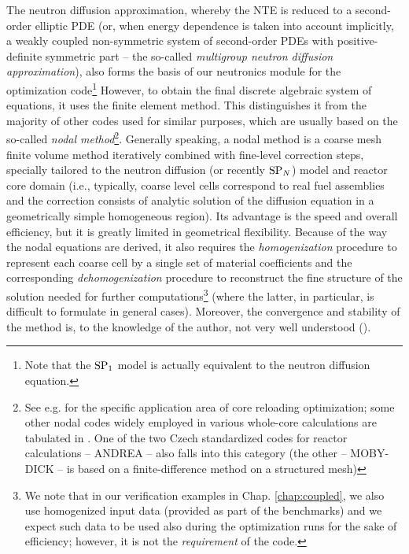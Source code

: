 The neutron diffusion approximation, whereby the NTE is reduced to a second-order elliptic PDE (or, when energy
dependence is taken into account implicitly, a weakly coupled non-symmetric system of second-order PDEs with
positive-definite symmetric part -- the so-called \textit{multigroup neutron diffusion approximation}), also forms the
basis of our neutronics module for the optimization code\footnote{Note that the $\SPN[1]$ model is actually equivalent
to the neutron diffusion equation.}
However, to obtain the final discrete algebraic system of equations, it uses the finite element method. 
This distinguishes it from the majority of other codes used for similar purposes, which are usually based on the so-called \textit{nodal method}\footnote{See e.g.
\cite{opt1,opt2,opt3} for the specific application area of core reloading optimization; some other nodal codes widely
employed in various whole-core calculations are tabulated in \cite{mox-bench}. One of the two Czech standardized codes
for reactor calculations -- ANDREA \cite{ANDREA} -- also falls into this category (the other -- MOBY-DICK
\cite{MOBYDICK} -- is based on a finite-difference method on a structured mesh)\label{ftn:nodal}}.
Generally speaking, a nodal method is a coarse mesh finite volume method iteratively combined with fine-level correction steps, specially tailored to the
neutron diffusion (or recently $\SPN$) model and reactor core domain (i.e., typically, coarse level cells
correspond to real fuel assemblies and the correction consists of analytic solution of the diffusion equation in a
geometrically simple homogeneous region). Its advantage is the speed and overall efficiency, but it is greatly limited
in geometrical flexibility. Because of the way the nodal equations are derived, it also requires the
\textit{homogenization} procedure to represent each coarse cell by a single set of material coefficients and the 
corresponding \textit{dehomogenization} procedure to reconstruct the fine structure of the solution needed for further 
computations\footnote{We note that in our verification examples in Chap. \cref{chap:coupled}, we also use homogenized
input data (provided as part of the benchmarks) and we expect such data to be used also during the optimization runs for the
sake of efficiency; however, it is not the \textit{requirement} of the code.} (where the latter, in particular, is difficult to formulate in general cases).
Moreover, the convergence and stability of the method is, to the knowledge of the author, not very well understood 
(\cite{ZiminComm}).

